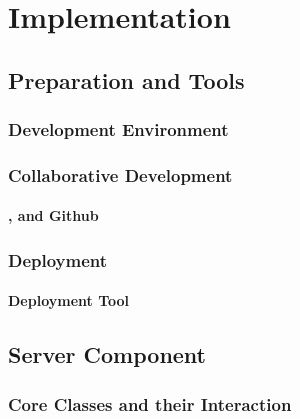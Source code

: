 \chapter{Implementation}
\label{chapter:Implementation}


\section{Preparation and Tools}

\subsection{Development Environment}

\subsection{Collaborative Development}

\subsubsection{,  and Github}

\subsection{Deployment}

\subsubsection{Deployment Tool }


\section{Server Component}

\subsection{Core Classes and their Interaction}

\subsubsection{}
\subsubsection{}
\subsubsection{}
